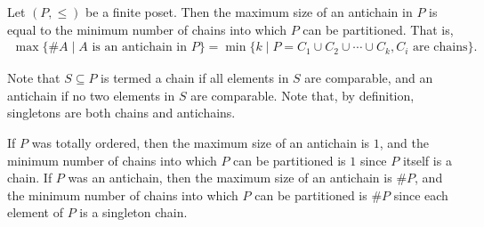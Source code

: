 \begin{theorem}
    Let $(P, \leq)$ be a finite poset. Then the maximum size of an antichain in $P$ is equal to the minimum number of chains into which $P$ can be partitioned. That is,
    \begin{align}
        \max \{\#A \mid A \text{ is an antichain in } P\} = \min \{k \mid P = C_{1} \cup C_{2} \cup \cdots \cup C_{k}, C_{i} \text{ are chains}\}.
    \end{align}
\end{theorem}
Note that $S \subseteq P$ is termed a chain if all elements in $S$ are comparable, and an antichain if no two elements in $S$ are comparable. Note that, by definition, singletons are both chains and antichains.

If $P$ was totally ordered, then the maximum size of an antichain is $1$, and the minimum number of chains into which $P$ can be partitioned is $1$ since $P$ itself is a chain. If $P$ was an antichain, then the maximum size of an antichain is $\#P$, and the minimum number of chains into which $P$ can be partitioned is $\#P$ since each element of $P$ is a singleton chain.

